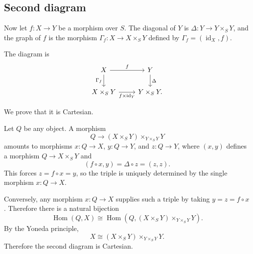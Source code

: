 \subsection{Second diagram}

Now let \(f:X\to Y\) be a morphism over \(S\). The diagonal of \(Y\) is \(\Delta:Y\to Y\times_S Y\), and the graph of \(f\) is the morphism \(\Gamma_f:X\to X\times_S Y\) defined by \(\Gamma_f=(\operatorname{id}_X,f)\).

The diagram is
\[
\begin{tikzcd}
	X \arrow[r,"f"] \arrow[d,"\Gamma_f"']
	&
	Y \arrow[d,"\Delta"]
	\\
	X\times_S Y \arrow[r,"f\times \operatorname{id}_Y"']
	&
	Y\times_S Y.
\end{tikzcd}
\]

We prove that it is Cartesian.

Let \(Q\) be any object. A morphism
\[
Q\longrightarrow
(X\times_S Y)\times_{Y\times_S Y}Y
\]
amounts to morphisms \(x:Q\to X\), \(y:Q\to Y\), and \(z:Q\to Y\), where \((x,y)\) defines a morphism \(Q\to X\times_S Y\) and
\[
(f\circ x,y)=\Delta\circ z=(z,z).
\]
This forces \(z=f\circ x=y\), so the triple is uniquely determined by the single morphism \(x:Q\to X\).

Conversely, any morphism \(x:Q\to X\) supplies such a triple by taking \(y=z=f\circ x\).
Therefore there is a natural bijection
\[
\operatorname{Hom}(Q,X)
\cong
\operatorname{Hom}
\left(
Q,(X\times_S Y)\times_{Y\times_S Y}Y
\right).
\]
By the Yoneda principle,
\[
X
\cong
(X\times_S Y)\times_{Y\times_S Y}Y.
\]
Therefore the second diagram is Cartesian.
